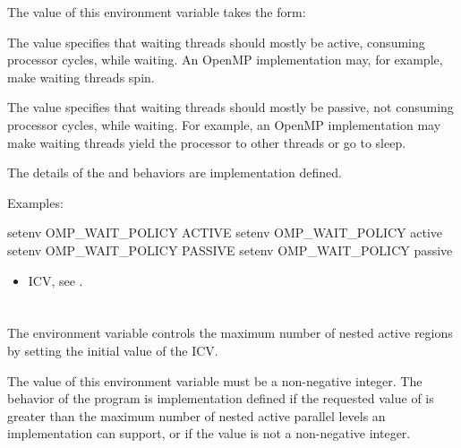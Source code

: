 The value of this environment variable takes the form:


The  value specifies that waiting threads should mostly be active, consuming 
processor cycles, while waiting. An OpenMP implementation may, for example, make 
waiting threads spin. 

The  value specifies that waiting threads should mostly be passive, not 
consuming processor cycles, while waiting. For example, an OpenMP implementation 
may make waiting threads yield the processor to other threads or go to sleep.

The details of the  and  behaviors are implementation defined. 

Examples:
\begin{boxedcode}
setenv OMP\_WAIT\_POLICY ACTIVE 
setenv OMP\_WAIT\_POLICY active 
setenv OMP\_WAIT\_POLICY PASSIVE 
setenv OMP\_WAIT\_POLICY passive 
\end{boxedcode}

\crossreferences
\begin{itemize}
\item {} ICV, see . 
\end{itemize}










\section{}
\label{sec:OMP_MAX_ACTIVE_LEVELS}
The  environment variable controls the maximum number 
of nested active  regions by setting the initial value of the  ICV.

The value of this environment variable must be a non-negative integer. The behavior of 
the program is implementation defined if the requested value of 
 is greater than the maximum number of nested active 
parallel levels an implementation can support, or if the value is not a non-negative 
integer.

